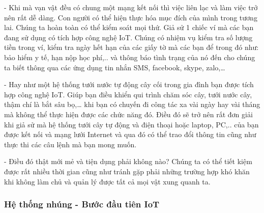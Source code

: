 	- Khi mà vạn vật đều có chung một mạng kết nối thì việc liên lạc và làm việc trở nên rất dễ dàng. Con người có thể hiện thực hóa mục đích của mình trong tương lai. Chúng ta hoàn toàn có thể kiểm soát mọi thứ. Giả sử 1 chiếc ví mà các bạn đang sử dụng có tích hợp công nghệ IoT. Chúng có nhiệm vụ kiểm tra số lượng tiền trong ví, kiểm tra ngày hết hạn của các giấy tờ mà các bạn để trong đó như: bảo hiểm y tế, hạn nộp học phí,.. và thông báo tình trạng của nó đến cho chúng ta biết thông qua các ứng dụng tin nhắn SMS, facebook, skype, zalo,…
	
	- Hay như một hệ thống tưới nước tự động cây cối trong gia đình bạn được tích hợp công nghệ IoT. Giúp bạn điều khiển qui trình chăm sóc cây, tưới nước cây, thậm chí là bắt sâu bọ,… khi bạn có chuyến đi công tác xa vài ngày hay vài tháng mà không thể thực hiện được các chức năng đó. Điều đó sẽ trở nên rất đơn giải khi giả sử mà hệ thống tưới cây tự động và điện thoại hoặc laptop, PC,.. của bạn được kết nối và mạng lưới Internet và qua đó có thể trao đổi thông tin cũng như thực thi các câu lệnh mà bạn mong muốn.
	
	- Điều đó thật mới mẻ và tiện dụng phải không nào? Chúng ta có thể tiết kiệm được rất nhiều thời gian cũng như tránh gặp phải những trường hợp khó khăn khi không làm chủ và quản lý được tất cả mọi vật xung quanh ta.
	\subsubsection{Hệ thống nhúng - Bước đầu tiên IoT}
	
	
